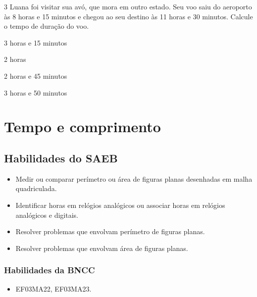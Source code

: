 \num{3} Luana foi visitar sua avó, que mora em outro estado. Seu voo
saiu do aeroporto às 8 horas e 15 minutos e chegou ao seu destino às 11
horas e 30 minutos. Calcule o tempo de duração do voo.

\begin{escolha}
\item
  3 horas e 15 minutos
\item
  2 horas 
\item
  2 horas e 45 minutos
\item
  3 horas e 50 minutos
\end{escolha}

\chapter{Tempo e comprimento}
\enlargethispage{6\baselineskip}

\vspace*{-1.5cm}

\section*{Habilidades do SAEB}

\begin{itemize}
\item Medir ou comparar perímetro ou área de figuras planas desenhadas em malha quadriculada.

\item Identificar horas em relógios analógicos ou associar horas em relógios analógicos e digitais.

\item Resolver problemas que envolvam perímetro de figuras planas.

\item Resolver problemas que envolvam área de figuras planas.
\end{itemize}

\subsection{Habilidades da BNCC}

\begin{itemize}
 \item  EF03MA22, EF03MA23.
\end{itemize}

